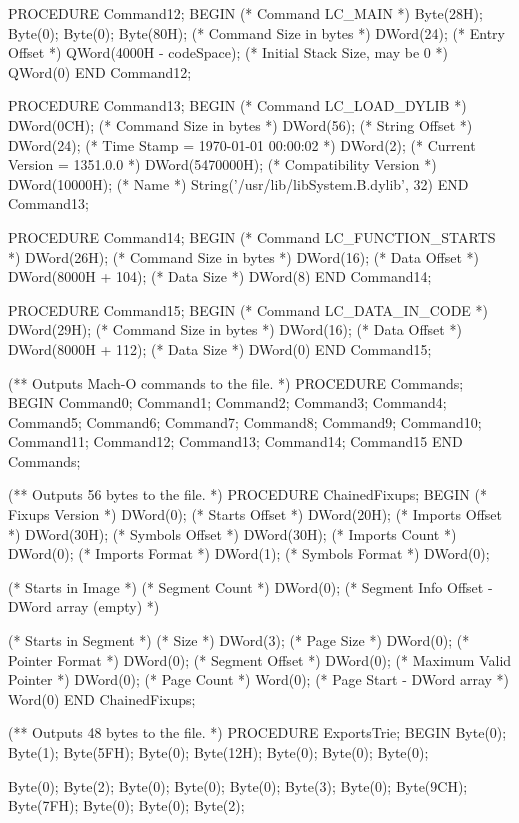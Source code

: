 \documentclass[utf8]{lgu}
\begin{document}
\begin{modula2long}
PROCEDURE Command12;
BEGIN
  (* Command LC_MAIN *)
  Byte(28H); Byte(0); Byte(0); Byte(80H);
  (* Command Size in bytes *)
  DWord(24);
  (* Entry Offset *)
  QWord(4000H - codeSpace);
  (* Initial Stack Size, may be 0 *)
  QWord(0)
END Command12;

PROCEDURE Command13;
BEGIN
  (* Command LC_LOAD_DYLIB *)
  DWord(0CH);
  (* Command Size in bytes *)
  DWord(56);
  (* String Offset *)
  DWord(24);
  (* Time Stamp = 1970-01-01 00:00:02 *)
  DWord(2);
  (* Current Version = 1351.0.0 *)
  DWord(5470000H);
  (* Compatibility Version *)
  DWord(10000H);
  (* Name *)
  String('/usr/lib/libSystem.B.dylib', 32)
END Command13;

PROCEDURE Command14;
BEGIN
  (* Command LC_FUNCTION_STARTS *)
  DWord(26H);
  (* Command Size in bytes *)
  DWord(16);
  (* Data Offset *)
  DWord(8000H + 104);
  (* Data Size *)
  DWord(8)
END Command14;

PROCEDURE Command15;
BEGIN
  (* Command LC_DATA_IN_CODE *)
  DWord(29H);
  (* Command Size in bytes *)
  DWord(16);
  (* Data Offset *)
  DWord(8000H + 112);
  (* Data Size *)
  DWord(0)
END Command15;

(** Outputs Mach-O commands to the file. *)
PROCEDURE Commands;
BEGIN
  Command0;
  Command1;
  Command2;
  Command3;
  Command4;
  Command5;
  Command6;
  Command7;
  Command8;
  Command9;
  Command10;
  Command11;
  Command12;
  Command13;
  Command14;
  Command15
END Commands;

(** Outputs 56 bytes to the file. *)
PROCEDURE ChainedFixups;
BEGIN
  (* Fixups Version *)
  DWord(0);
  (* Starts Offset *)
  DWord(20H);
  (* Imports Offset *)
  DWord(30H);
  (* Symbols Offset *)
  DWord(30H);
  (* Imports Count *)
  DWord(0);
  (* Imports Format *)
  DWord(1);
  (* Symbols Format *)
  DWord(0);

  (* Starts in Image *)
  (* Segment Count *)
  DWord(0);
  (* Segment Info Offset - DWord array (empty) *)

  (* Starts in Segment *)
  (* Size *)
  DWord(3);
  (* Page Size *)
  DWord(0);
  (* Pointer Format *)
  DWord(0);
  (* Segment Offset *)
  DWord(0);
  (* Maximum Valid Pointer *)
  DWord(0);
  (* Page Count *)
  Word(0);
  (* Page Start - DWord array *)
  Word(0)
END ChainedFixups;

(** Outputs 48 bytes to the file. *)
PROCEDURE ExportsTrie;
BEGIN
  Byte(0);   Byte(1);   Byte(5FH); Byte(0);
  Byte(12H); Byte(0);   Byte(0);   Byte(0);

  Byte(0);   Byte(2);   Byte(0);   Byte(0);
  Byte(0);   Byte(3);   Byte(0);   Byte(9CH);
  Byte(7FH); Byte(0);   Byte(0);   Byte(2);


\end{modula2long}
\end{document}
